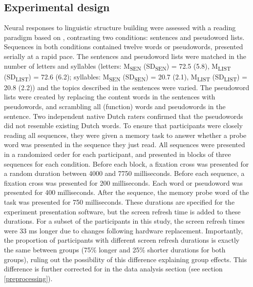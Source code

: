 \subsection{Experimental design}
Neural responses to linguistic structure building were assessed with a reading paradigm based on \cite{fedorenko2010}, contrasting two conditions: sentences and pseudoword lists. Sequences in both conditions contained twelve words or pseudowords, presented serially at a rapid pace. The sentences and pseudoword lists were matched in the number of letters and syllables (letters: M\textsubscript{SEN} (SD\textsubscript{SEN}) = 72.5 (5.8), M\textsubscript{LIST} (SD\textsubscript{LIST}) = 72.6 (6.2); syllables: M\textsubscript{SEN} (SD\textsubscript{SEN}) = 20.7 (2.1), M\textsubscript{LIST} (SD\textsubscript{LIST}) = 20.8 (2.2)) and the topics described in the sentences were varied. The pseudoword lists were created by replacing the content words in the sentences with pseudowords, and scrambling all (function) words and pseudowords in the sentence. Two independent native Dutch raters confirmed that the pseudowords did not resemble existing Dutch words. To ensure that participants were closely reading all sequences, they were given a memory task to answer whether a probe word was presented in the sequence they just read. All sequences were presented in a randomized order for each participant, and presented in blocks of three sequences for each condition. Before each block, a fixation cross was presented for a random duration between 4000 and 7750 milliseconds. Before each sequence, a fixation cross was presented for 200 milliseconds. Each word or pseudoword was presented for 400 milliseconds. After the sequence, the memory probe word of the task was presented for 750 milliseconds. These durations are specified for the experiment presentation software, but the screen refresh time is added to these durations. For a subset of the participants in this study, the screen refresh times were 33 ms longer due to changes following hardware replacement. Importantly, the proportion of participants with different screen refresh durations is exactly the same between groups (75\% longer and 25\% shorter durations for both groups), ruling out the possibility of this difference explaining group effects. This difference is further corrected for in the data analysis section (see section \ref{preprocessing}). 

